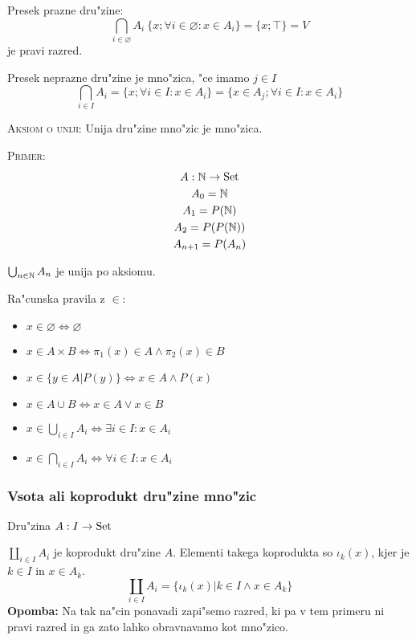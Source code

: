 Presek prazne dru"zine:
\begin{equation*}
\bigcap_{i \in \varnothing} A_i \ \{x; \forall i \in \varnothing: x \in A_i\} = \{x; \top\} = V
\end{equation*}
je pravi razred.

Presek neprazne dru"zine je mno"zica, "ce imamo $j \in I$
\begin{equation*}
\bigcap_{i \in I} A_i = \{x; \forall i \in I: x \in A_i\} = \{x \in A_j; \forall i \in I: x \in A_i\}
\end{equation*}

\textsc{Aksiom o uniji: } Unija dru"zine mno"zic je mno"zica.

\textsc{Primer:}
\begin{gather*}
A : \mathbb{N} \rightarrow \text{Set}\\
A_0 = \mathbb{N}\\
A_1 = P(\mathbb{N})\\
A_2 = P(P(\mathbb{N}))\\
A_{n+1} = P(A_n)
\end{gather*}

$\bigcup_{n \in \mathbb{N}} A_n$ je unija po aksiomu.

Ra"cunska pravila z $\in$:
\begin{itemize}
	\item $x \in \varnothing \iff \varnothing$
	\item $x \in A \times B \iff \pi_1(x) \in A \land \pi_2(x) \in B$
	\item $x \in \{y \in A| P(y)\} \iff x \in A \land P(x)$
	\item $x \in A \cup B \iff x \in A \lor x \in B$
	\item $x \in \bigcup_{i \in I} A_i \iff \exists i \in I: x \in A_i$
	\item $x \in \bigcap_{i \in I} A_i \iff \forall i \in I: x \in A_i$
\end{itemize}

\subsubsection{Vsota ali koprodukt dru"zine mno"zic}
Dru"zina $A: I \rightarrow \text{Set}$

$\coprod_{i \in I} A_i$ je koprodukt dru"zine $A$. Elementi takega koprodukta so $\iota_k(x)$, kjer je $k \in I$ in $x \in A_k$.
\begin{equation*}
\coprod_{i \in I} A_i = \{\iota_k(x) | k \in I \land x \in A_k\}
\end{equation*}
\textbf{Opomba:} Na tak na"cin ponavadi zapi"semo razred, ki pa v tem primeru ni pravi razred in ga zato lahko obravnavamo kot mno"zico.

